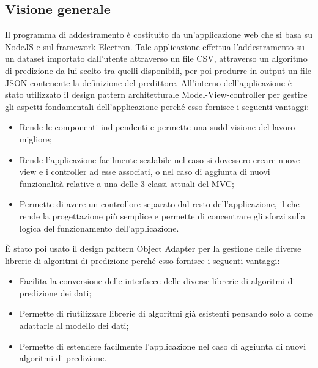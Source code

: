\documentclass[../manuale-sviluppatore.tex]{subfiles}
\begin{document}
\subsection{Visione generale}%
\label{subs:installazione_applicazione_di_addestramento}
Il programma di addestramento è costituito da un'applicazione web che si basa su NodeJS e sul framework Electron.
Tale applicazione effettua l'addestramento su un dataset importato dall'utente attraverso un file CSV, attraverso un algoritmo di predizione da lui scelto tra quelli disponibili, per poi produrre in output
un file JSON contenente la definizione del predittore.
All'interno dell'applicazione è stato utilizzato il design pattern architetturale Model-View-controller per gestire gli aspetti fondamentali dell'applicazione perché esso fornisce i seguenti vantaggi:
\begin{itemize}
    \item Rende le componenti indipendenti e permette una suddivisione del lavoro migliore;
    \item Rende l'applicazione facilmente scalabile nel caso si dovessero creare nuove view e i controller ad esse associati, o nel caso di aggiunta di nuovi funzionalità relative a una delle 3 classi attuali del MVC;
    \item Permette di avere un controllore separato dal resto dell’applicazione, il che rende la progettazione più semplice e permette di concentrare gli sforzi sulla logica del funzionamento dell'applicazione.
\end{itemize}

È stato poi usato il design pattern Object Adapter per la gestione delle diverse librerie di algoritmi di predizione perché esso fornisce i seguenti vantaggi:
\begin{itemize}
    \item Facilita la conversione delle interfacce delle diverse librerie di algoritmi di predizione dei dati;
    \item Permette di riutilizzare librerie di algoritmi già esistenti pensando solo a come adattarle al modello dei dati;
    \item Permette di estendere facilmente l'applicazione nel caso di aggiunta di nuovi algoritmi di predizione.
\end{itemize}
\end{document}
